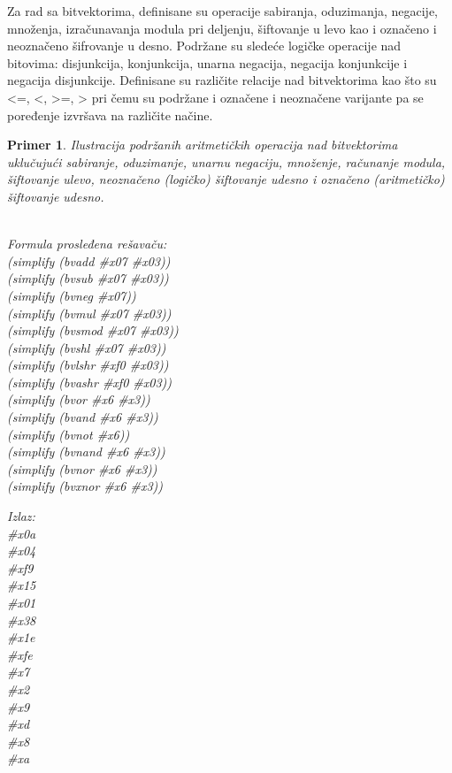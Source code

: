 \documentclass[12pt,oneside]{memoir}
\newtheorem{primer}{Primer}
\begin{document}
Za rad sa bitvektorima, definisane su operacije sabiranja, oduzimanja, negacije, množenja, izračunavanja modula pri deljenju, šiftovanje u levo kao i označeno i neoznačeno šifrovanje u desno. Podržane su sledeće logičke operacije nad bitovima: disjunkcija, konjunkcija, unarna negacija, negacija konjunkcije i negacija disjunkcije. Definisane su različite relacije nad bitvektorima kao što su <=, <, >=, > pri čemu su podržane i označene i neoznačene varijante pa se poređenje izvršava na različite načine. 


\begin{primer} Ilustracija podržanih aritmetičkih operacija nad bitvektorima uklučujući sabiranje, oduzimanje, unarnu negaciju, množenje, računanje modula, šiftovanje ulevo, neoznačeno (logičko) šiftovanje udesno i označeno (aritmetičko) šiftovanje udesno.
\\\\
\begin{minipage}[b]{0.5\textwidth}
Formula prosleđena rešavaču:
\\(simplify (bvadd \#x07 \#x03)) 
\\(simplify (bvsub \#x07 \#x03))
\\(simplify (bvneg \#x07)) 
\\(simplify (bvmul \#x07 \#x03)) 
\\(simplify (bvsmod \#x07 \#x03)) 
\\(simplify (bvshl \#x07 \#x03)) 
\\(simplify (bvlshr \#xf0 \#x03)) 
\\(simplify (bvashr \#xf0 \#x03)) 
\\(simplify (bvor \#x6 \#x3)) 
\\(simplify (bvand \#x6 \#x3))  
\\(simplify (bvnot \#x6)) 
\\(simplify (bvnand \#x6 \#x3)) 
\\(simplify (bvnor \#x6 \#x3)) 
\\(simplify (bvxnor \#x6 \#x3)) 

\end{minipage}
\hspace{2.5cm}
\begin{minipage}[b]{0.5\textwidth}
Izlaz:
\\\#x0a 
\\\#x04 
\\\#xf9 
\\\#x15 
\\\#x01 
\\\#x38 
\\\#x1e 
\\\#xfe
\\\#x7 
\\\#x2 
\\\#x9 
\\\#xd 
\\\#x8 
\\\#xa
\end{minipage}

\end{primer}
\end{document}
